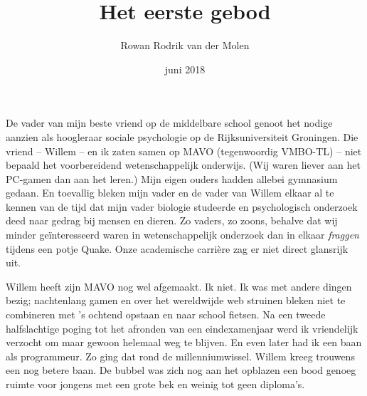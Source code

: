 \documentclass[12pt,a4paper]{article}
\begin{document}
\title{Het eerste gebod}
\author{Rowan Rodrik van der Molen}
\date{juni 2018}
\maketitle




De vader van mijn beste vriend op de middelbare school genoot het nodige aanzien als hoogleraar sociale psychologie op de Rijksuniversiteit Groningen. Die vriend – Willem – en ik zaten samen op MAVO (tegenwoordig VMBO-TL) – niet bepaald het voorbereidend wetenschappelijk onderwijs. (Wij waren liever aan het PC-gamen dan aan het leren.) Mijn eigen ouders hadden allebei gymnasium gedaan. En toevallig bleken mijn vader en de vader van Willem elkaar al te kennen van de tijd dat mijn vader biologie studeerde en psychologisch onderzoek deed naar gedrag bij mensen en dieren. Zo vaders, zo zoons, behalve dat wij minder geïnteresseerd waren in wetenschappelijk onderzoek dan in elkaar \emph{fraggen} tijdens een potje Quake. Onze academische carrière zag er niet direct glansrijk uit.

Willem heeft zijn MAVO nog wel afgemaakt. Ik niet. Ik was met andere dingen bezig; nachtenlang gamen en over het wereldwijde web struinen bleken niet te combineren met 's ochtend opstaan en naar school fietsen. Na een tweede halfslachtige poging tot het afronden van een eindexamenjaar werd ik vriendelijk verzocht om maar gewoon helemaal weg te blijven. En even later had ik een baan als programmeur. Zo ging dat rond de millenniumwissel. Willem kreeg trouwens een nog betere baan. De bubbel was zich nog aan het opblazen een bood genoeg ruimte voor jongens met een grote bek en weinig tot geen diploma's.
\end{document}
